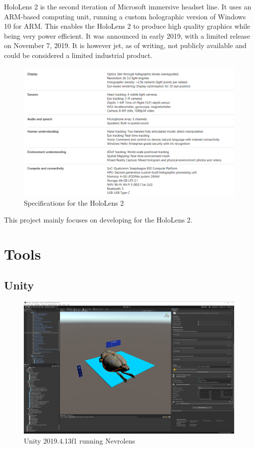 HoloLens 2 is the second iteration of Microsoft immersive headset line. It uses an ARM-based computing unit, running a custom holographic version of Windows 10 for ARM. This enables the HoloLens 2 to produce high quality graphics while being very power efficient. It was announced in early 2019, with a limited release on November 7, 2019. It is however jet, as of writing, not publicly available and could be considered a limited industrial product.

\begin{figure}[ht]
    \includegraphics[width=\textwidth]{fig/hololens2specs}
    \caption{Specifications for the HoloLens 2}
\end{figure}

This project mainly focuses on developing for the HoloLens 2.


\section{Tools}\label{chap:tools}


\subsection*{Unity}\label{chap:unity}

\begin{figure}[ht]
    \centering
    \includegraphics[width=\textwidth]{fig/unity_example.png}
    \caption{Unity 2019.4.13f1 running Nevrolens}
\end{figure}

